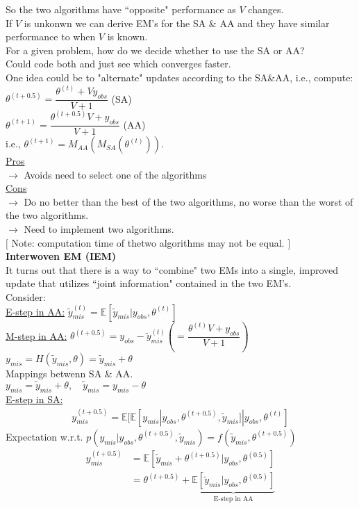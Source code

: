 \documentclass[12pt]{article}
\begin{document}
\begin{flushleft}
\bigskip
So the two algorithms have ``opposite" performance as $V$ changes.\\
If $V$ is unkonwn we can derive EM's for the SA \& AA and they have similar performance to when $V$ is known.\\
For a given problem, how do we decide whether to use the SA or AA?\\
Could code both and just see which converges faster.\\
One idea could be to "alternate" updates according to the SA\&AA, i.e., compute:\\
$\theta^{(t+0.5)}=\dfrac{\theta^{(t)}+Vy_{obs}}{V+1}$ \quad(SA)\\
$\theta^{(t+1)}=\dfrac{\theta^{(t+0.5)}V+y_{obs}}{V+1}$ \quad(AA)\\
i.e., $\theta^{(t+1)} = M_{AA}(M_{SA}(\theta^{(t)}))$.\\

\bigskip
\underline{Pros}\\
$\longrightarrow$ Avoids need to select one of the algorithms\\

\underline{Cons}\\
$\longrightarrow$ Do no better than the best of the two algorithms, no worse than the worst of the two algorithms.\\
$\longrightarrow$ Need to implement two algorithms.\\
$[$ Note: computation time of thetwo algorithms may not be equal. $]$\\

\bigskip
{\bf Interwoven EM (IEM)}\\
It turns out that there is a way to ``combine" two EMs into a single, improved update that utilizes ``joint information" contained in the two EM's.\\
Consider:\\ 
\underline{E-step in AA:} \quad $\tilde{y}_{mis}^{(t)}=\mathbb{E}[ \tilde{y}_{mis}|y_{obs}, \theta^{(t)}]$\\
\underline{M-step in AA:} \quad $\theta^{(t+0.5)}=y_{obs}-\tilde{y}_{mis}^{(t)} (=\dfrac{\theta^{(t)}V+y_{obs}}{V+1})$\\ 
$y_{mis}=H(\tilde{y}_{mis},\theta)=\tilde{y}_{mis}+\theta$\\
Mappings betwenn SA \& AA.\\
$y_{mis}=\tilde{y}_{mis}+\theta, \quad \tilde{y}_{mis}=y_{mis}-\theta$\\
\bigskip
\underline{E-step in SA:} \quad 
\begin{align*}
y_{mis}^{(t+0.5)}=\mathbb{E}[\mathbb{E}[y_{mis}|y_{obs},\theta^{(t+0.5)},\tilde{y}_{mis}]|y_{obs},\theta^{(t)}]
\end{align*}
Expectation w.r.t. $p(y_{mis}|y_{obs},\theta^{(t+0.5)},\tilde{y}_{mis})=f(\tilde{y}_{mis},\theta^{(t+0.5)})$
\begin{align*}
y_{mis}^{(t+0.5)} & = \mathbb{E}[\tilde{y}_{mis}+\theta^{(t+0.5)}|y_{obs},\theta^{(0.5)}]\\
                  & = \theta^{(t+0.5)} + \underbrace{\mathbb{E}[\tilde{y}_{mis}|y_{obs},\theta^{(0.5)}]}_\text{E-step in AA}
\end{align*}



\end{flushleft}
\end{document}
